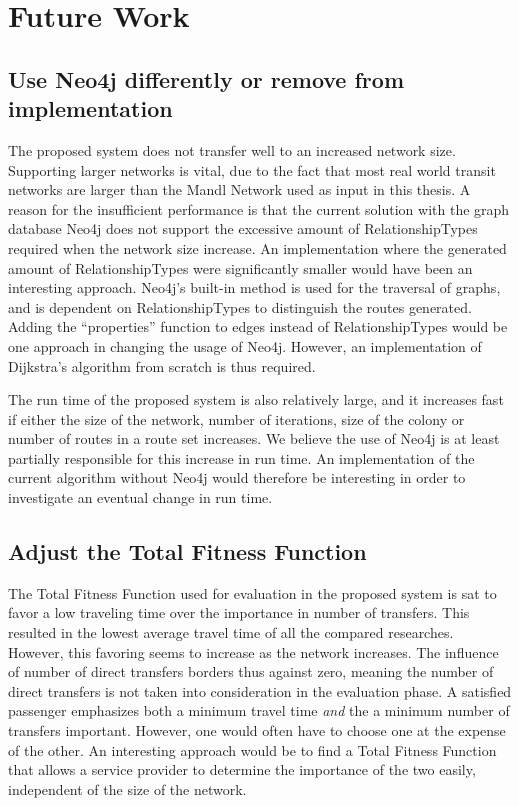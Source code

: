 \section{Future Work}

\subsection*{Use Neo4j differently or remove from implementation}
The proposed system does not transfer well to an increased network size. Supporting larger networks is vital, due to the fact that most real world transit networks are larger than the Mandl Network used as input in this thesis. A reason for the insufficient performance is that the current solution with the graph database Neo4j does not support the excessive amount of RelationshipTypes required when the network size increase. An implementation where the generated amount of RelationshipTypes were significantly smaller would have been an interesting approach. Neo4j's built-in method is used for the traversal of graphs, and is dependent on RelationshipTypes to distinguish the routes generated. Adding the ``properties'' function to edges instead of RelationshipTypes would be one approach in changing the usage of Neo4j. However, an implementation of Dijkstra's algorithm from scratch is thus required. 
\newline

The run time of the proposed system is also relatively large, and it increases fast if either the size of the network, number of iterations, size of the colony or number of routes in a route set increases. We believe the use of Neo4j is at least partially responsible for this increase in run time. An implementation of the current algorithm without Neo4j would therefore be interesting in order to investigate an eventual change in run time.  

\subsection*{Adjust the Total Fitness Function}
The Total Fitness Function used for evaluation in the proposed system is sat to favor a low traveling time over the importance in number of transfers. This resulted in the lowest average travel time of all the compared researches. However, this favoring seems to increase as the network increases. The influence of number of direct transfers borders thus against zero, meaning the number of direct transfers is not taken into consideration in the evaluation phase. A satisfied passenger emphasizes both a minimum travel time \textit{and} the a minimum number of transfers important. However, one would often have to choose one at the expense of the other. An interesting approach would be to find a Total Fitness Function that allows a service provider to determine the importance of the two easily, independent of the size of the network.

